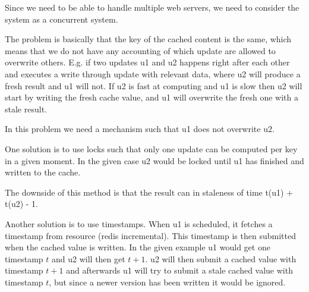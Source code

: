



%
%
%



Since we need to be able to handle multiple web servers, we need to consider
the system as a concurrent system.

The problem is basically that the key of the cached content is the same, which
means that we do not have any accounting of which update are allowed to
overwrite others. E.g. if two updates u1 and u2 happens right after each other
and executes a write through update with relevant data, where u2 will produce
a fresh result and u1 will not. If u2 is fast at computing and u1 is slow then
u2 will start by writing the fresh cache value, and u1 will overwrite the
fresh one with a stale result.

In this problem we need a mechanism such that u1 does not overwrite u2.


One solution is to use locks such that only one update can be computed per
key in a given moment. In the given case u2 would be locked until u1 has
finished and written to the cache.

The downside of this method is that the result can in staleness of time t(u1) + t(u2) - 1.


Another solution is to use timestamps. When u1 is scheduled, it fetches a
timestamp from resource (redis incremental). This timestamp is then submitted
when the cached value is written. In the given example u1 would get one
timestamp $t$ and u2 will then get $t + 1$. u2 will then submit a cached value
with timestamp $t + 1$ and afterwards u1 will try to submit a stale cached value
with timestamp $t$, but since a newer version has been written it would be ignored.

